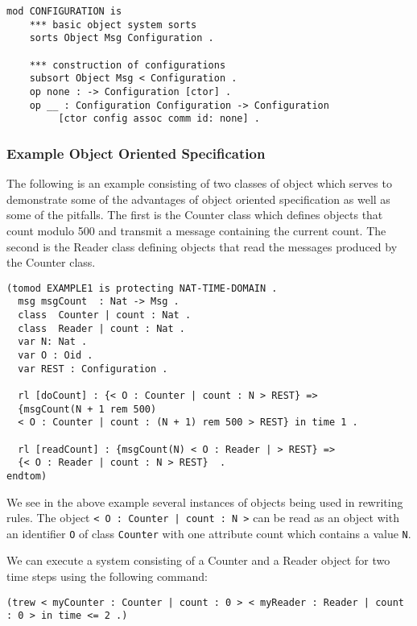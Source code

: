 \begin{lstlisting}[caption = The Maude Configuration module]
mod CONFIGURATION is  
    *** basic object system sorts  
    sorts Object Msg Configuration .  
 
    *** construction of configurations  
    subsort Object Msg < Configuration .  
    op none : -> Configuration [ctor] .  
    op __ : Configuration Configuration -> Configuration  
         [ctor config assoc comm id: none] .
\end{lstlisting}

\subsubsection*{Example Object Oriented Specification}
The following is an example consisting of two classes of object which serves to demonstrate some of the advantages of object oriented specification as well as some of the pitfalls. The first is the Counter class which defines objects that count modulo 500 and transmit a message containing the current count. The second is the Reader class defining objects that read the messages produced by the Counter class. 

\begin{lstlisting}[caption = Example object oriented specification, label = code:rtmaudeexample]
(tomod EXAMPLE1 is protecting NAT-TIME-DOMAIN .
  msg msgCount  : Nat -> Msg .  
  class  Counter | count : Nat .
  class  Reader | count : Nat .
  var N: Nat .
  var O : Oid .
  var REST : Configuration .
 
  rl [doCount] : {< O : Counter | count : N > REST} => 
  {msgCount(N + 1 rem 500)  
  < O : Counter | count : (N + 1) rem 500 > REST} in time 1 . 

  rl [readCount] : {msgCount(N) < O : Reader | > REST} => 
  {< O : Reader | count : N > REST}  . 
endtom)
\end{lstlisting} 
We see in the above example several instances of objects being used in rewriting rules. The object \texttt{< O : Counter | count : N >} can be read as an object with an identifier \texttt{O} of class \texttt{Counter} with one attribute count which contains a value \texttt{N}.

We can execute a system consisting of a Counter and a Reader object for two time steps using the following command:
\begin{center}
\texttt{(trew {< myCounter : Counter |  count : 0 > < myReader : Reader | count : 0 >} in time <= 2 .)}
\end{center}


